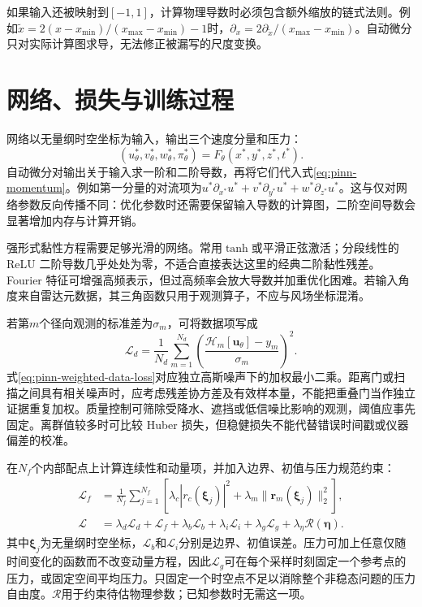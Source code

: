 如果输入还被映射到$[-1,1]$，计算物理导数时必须包含额外缩放的链式法则。例如$\widetilde x=2(x-x_{\min})/(x_{\max}-x_{\min})-1$时，$\partial_x=2\partial_{\widetilde x}/(x_{\max}-x_{\min})$。自动微分只对实际计算图求导，无法修正被漏写的尺度变换。

\section{网络、损失与训练过程}
\label{sec:pinn-training}
网络以无量纲时空坐标为输入，输出三个速度分量和压力：
\begin{equation}
 (u_\theta^*,v_\theta^*,w_\theta^*,\pi_\theta^*)
 =F_\theta(x^*,y^*,z^*,t^*).
\end{equation}
自动微分对输出关于输入求一阶和二阶导数，再将它们代入式\eqref{eq:pinn-momentum}。例如第一分量的对流项为$u^*\partial_{x^*}u^*+v^*\partial_{y^*}u^*+w^*\partial_{z^*}u^*$。这与仅对网络参数反向传播不同：优化参数时还需要保留输入导数的计算图，二阶空间导数会显著增加内存与计算开销。

强形式黏性方程需要足够光滑的网络。常用$\tanh$或平滑正弦激活；分段线性的 ReLU 二阶导数几乎处处为零，不适合直接表达这里的经典二阶黏性残差。Fourier 特征可增强高频表示，但过高频率会放大导数并加重优化困难。若输入角度来自雷达元数据，其三角函数只用于观测算子，不应与风场坐标混淆。

若第$m$个径向观测的标准差为$\sigma_m$，可将数据项写成
\begin{equation}
 \mathcal L_d=\frac1{N_d}\sum_{m=1}^{N_d}
 \left(\frac{\mathcal H_m[\mathbf u_\theta]-y_m}{\sigma_m}\right)^2.\label{eq:pinn-weighted-data-loss}
\end{equation}
式\eqref{eq:pinn-weighted-data-loss}对应独立高斯噪声下的加权最小二乘。距离门或扫描之间具有相关噪声时，应考虑残差协方差及有效样本量，不能把重叠门当作独立证据重复加权。质量控制可筛除受降水、遮挡或低信噪比影响的观测，阈值应事先固定。离群值较多时可比较 Huber 损失，但稳健损失不能代替错误时间戳或仪器偏差的校准。

在$N_f$个内部配点上计算连续性和动量项，并加入边界、初值与压力规范约束：
\begin{align}
 \mathcal L_f&=\frac1{N_f}\sum_{j=1}^{N_f}
 \left[\lambda_c|r_c(\boldsymbol\xi_j)|^2
 +\lambda_m\|\mathbf r_m(\boldsymbol\xi_j)\|_2^2\right],\\
 \mathcal L&=\lambda_d\mathcal L_d+\mathcal L_f
 +\lambda_b\mathcal L_b+\lambda_i\mathcal L_i
 +\lambda_g\mathcal L_g+\lambda_\eta\mathcal R(\boldsymbol\eta).
 \label{eq:pinn-loss}
\end{align}
其中$\boldsymbol\xi_j$为无量纲时空坐标，$\mathcal L_b$和$\mathcal L_i$分别是边界、初值误差。压力可加上任意仅随时间变化的函数而不改变动量方程，因此$\mathcal L_g$可在每个采样时刻固定一个参考点的压力，或固定空间平均压力。只固定一个时空点不足以消除整个非稳态问题的压力自由度。$\mathcal R$用于约束待估物理参数；已知参数时无需这一项。

